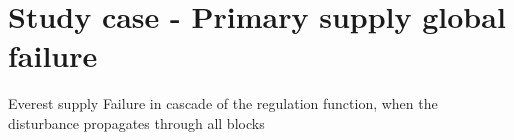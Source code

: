 \section{Study case - Primary supply global failure}
\label{sec:testchip_study}
Everest supply
Failure in cascade of the regulation function, when the disturbance propagates through all blocks
